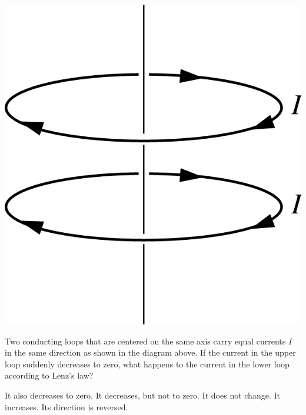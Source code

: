 \begin{center}
\includegraphics[scale=0.25]{images/img-011-023.png}
\end{center}

\begin{questions}\setcounter{question}{19}\question
Two conducting loops that are centered on the same axis carry equal currents $I$ in the same direction as shown in the diagram above. If the current in the upper loop suddenly decreases to zero, what happens to the current in the lower loop according to Lenz's law?

\begin{choices}
\choice It also decreases to zero.
\choice It decreases, but not to zero.
\choice It does not change.
\choice It increases.
\choice Its direction is reversed.
\end{choices}\end{questions}

